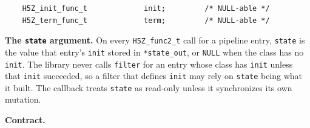 \documentclass[../RFC-HDFG-2026-003.tex]{subfiles}
\begin{document}
\begin{verbatim}
    H5Z_init_func_t             init;         /* NULL-able */
    H5Z_term_func_t             term;         /* NULL-able */
\end{verbatim}

\textbf{The \texttt{state} argument.}  On every \texttt{H5Z\_func2\_t}
call for a pipeline entry, \texttt{state} is the value that entry's
\texttt{init} stored in \texttt{*state\_out}, or \texttt{NULL} when the
class has no \texttt{init}.  The library never calls \texttt{filter} for
an entry whose class has \texttt{init} unless that \texttt{init}
succeeded, so a filter that defines \texttt{init} may rely on
\texttt{state} being what it built.  The callback treats \texttt{state}
as read-only unless it synchronizes its own mutation.

\textbf{Contract.}
\end{document}
